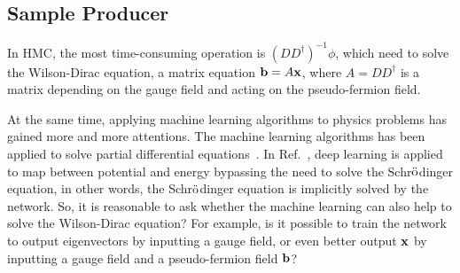\subsection{\label{sec:SampleProducer}Sample Producer}

In HMC, the most time-consuming operation is $\left(DD^{\dagger}\right)^{-1} \phi$, which need to solve the Wilson-Dirac equation, a matrix equation ${\bf b}=A{\bf x}$, where $A=DD^{\dagger}$ is a matrix depending on the gauge field and acting on the pseudo-fermion field.

At the same time, applying machine learning algorithms to physics problems has gained more and more attentions. The machine learning algorithms has been applied to solve partial differential equations~\cite{aipde}. In Ref.~\cite{aisolver1}, deep learning is applied to map between potential and energy bypassing the need to solve the Schr$\rm \ddot{o}$dinger equation, in other words, the Schr$\rm \ddot{o}$dinger equation is implicitly solved by the network. So, it is reasonable to ask whether the machine learning can also help to solve the Wilson-Dirac equation? For example, is it possible to train the network to output eigenvectors by inputting a gauge field, or even better output ${\bf x}$ by inputting a gauge field and a pseudo-fermion field ${\bf b}$?
 